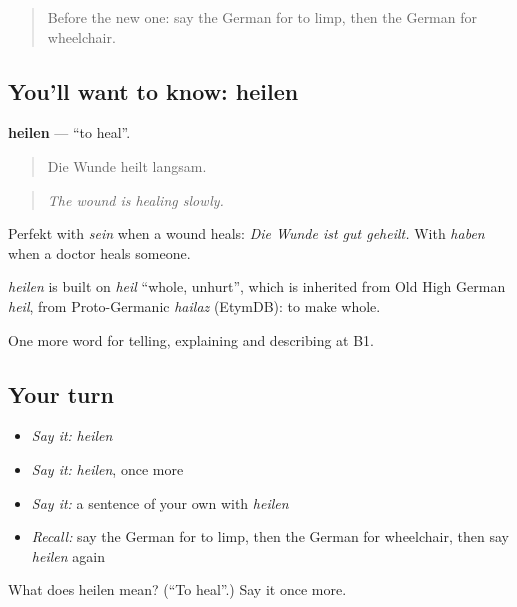 \label{lesson:GE-C483-heilen}



\begin{quote}
Before the new one: say the German for to limp, then the German for wheelchair.
\end{quote}

\subsection*{You'll want to know: heilen}
\textbf{heilen} — \textquotedblleft{}to heal\textquotedblright{}.

\begin{quote}
Die Wunde heilt langsam.
\end{quote}

\begin{quote}
\emph{The wound is healing slowly.}
\end{quote}

Perfekt with \emph{sein} when a wound heals: \emph{Die Wunde ist gut geheilt.} With \emph{haben} when a doctor heals someone.

\begin{cousinweb}
\emph{heilen} is built on \emph{heil} \textquotedblleft{}whole, unhurt\textquotedblright{}, which is inherited from Old High German \emph{heil}, from Proto-Germanic \emph{hailaz} (EtymDB): to make whole.
\end{cousinweb}

\begin{grammarlens}[title={What you've built}]
One more word for telling, explaining and describing at B1.
\end{grammarlens}

\subsection*{Your turn}
\begin{itemize}
\raggedright
  \item \emph{Say it:} \emph{heilen}
  \item \emph{Say it:} \emph{heilen}, once more
  \item \emph{Say it:} a sentence of your own with \emph{heilen}
  \item \emph{Recall:} say the German for to limp, then the German for wheelchair, then say \emph{heilen} again
\end{itemize}

\begin{tcolorbox}[breakable,colback=teal!4,colframe=teal!35!black,title={Before you move on}]
What does heilen mean? (\textquotedblleft{}To heal\textquotedblright{}.) Say it once more.
\end{tcolorbox}
